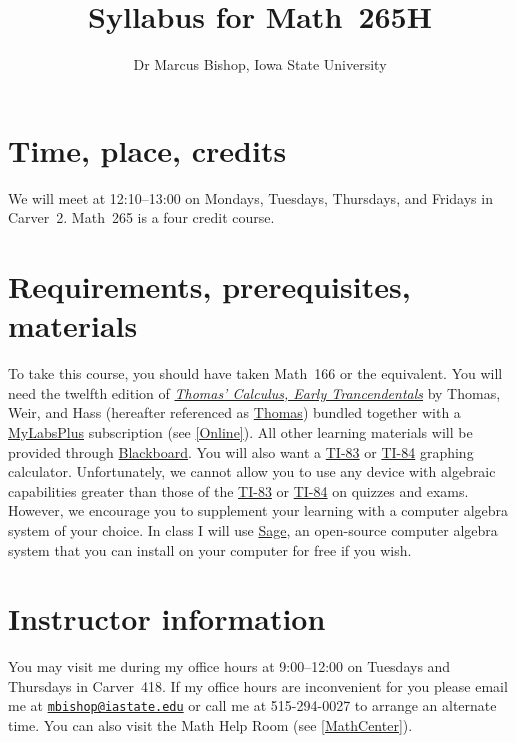 \documentclass[11pt]{article}
\title{Syllabus for Math~265H}
\author{Dr Marcus Bishop, Iowa State University}
\begin{document}
\maketitle

\section{Time, place, credits}\label{Time}
We will meet at 12:10--13:00
on Mondays, Tuesdays, Thursdays, and Fridays
in Carver~2.
Math~265 is a four credit course.

\section{Requirements, prerequisites, materials}\label{Require}
To take this course, you should have taken Math~166
or the equivalent. You will need the twelfth edition of 
\href{http://wps.aw.com/aw_thomas_calculus_series}
{\em Thomas' Calculus, Early Trancendentals}
by Thomas, Weir, and Hass (hereafter referenced as
\href{http://wps.aw.com/aw_thomas_calculus_series}{Thomas})
bundled together with a
\href{http://iastate.mylabsplus.com}{MyLabsPlus} subscription
(see \autoref{Online}).
All other learning materials will be provided through
\href{https://bb.its.iastate.edu}{Blackboard}.
You will also want a 
\href{http://en.wikipedia.org/wiki/TI-83}{TI-83} or
\href{http://en.wikipedia.org/wiki/TI-84}{TI-84}
graphing calculator. Unfortunately, we cannot allow you to use
any device with algebraic capabilities greater than those of the
\href{http://en.wikipedia.org/wiki/TI-83}{TI-83} or
\href{http://en.wikipedia.org/wiki/TI-84}{TI-84}
on quizzes and exams. However, we encourage
you to supplement your learning with a computer algebra system
of your choice.
In class I will use \href{http://www.sagemath.org}{\sf Sage},
an open-source computer algebra system that you can install on your
computer for free if you wish.

\section{Instructor information} You may visit me during my office 
hours at 9:00--12:00 on Tuesdays and Thursdays
in Carver~418. If my office hours are inconvenient for you
please email me at 
\href{mailto:mbishop@iastate.edu}{\tt mbishop@iastate.edu} or call me at 
515-294-0027 to arrange an alternate time.
You can also visit the Math Help Room (see \autoref{MathCenter}).
\end{document}
